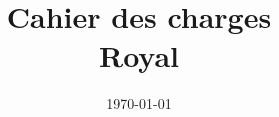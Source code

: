 \documentclass[T3,WIP]{rapport-iutrs}
\title{Cahier des charges\\Royal}
\date\today
\begin{document}
\pagedegarde 

\newpage{}

\newpage{}

\tableofcontents
\newpage{}


\newpage{}


\newpage{}


\newpage{}


\newpage{}


\end{document}

